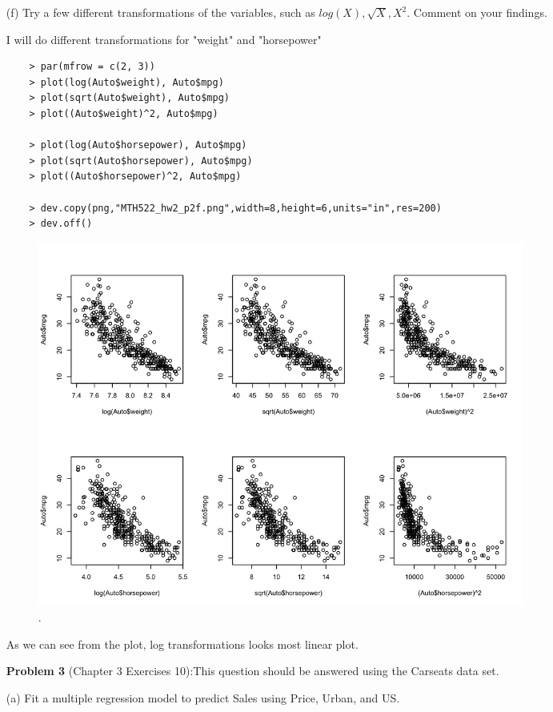 \documentclass{article}
\begin{document}
\begin{itemize}
\newpage


\item[(f)] Try a few different transformations of the variables, such as $ log(X), \sqrt{X}, X^2 $. Comment on your findings.


I will do different transformations for "weight" and "horsepower"

\begin{program}
	\begin{verbatim}
	> par(mfrow = c(2, 3))
	> plot(log(Auto$weight), Auto$mpg)
	> plot(sqrt(Auto$weight), Auto$mpg)
	> plot((Auto$weight)^2, Auto$mpg)

	> plot(log(Auto$horsepower), Auto$mpg)
	> plot(sqrt(Auto$horsepower), Auto$mpg)
	> plot((Auto$horsepower)^2, Auto$mpg)
	
	> dev.copy(png,"MTH522_hw2_p2f.png",width=8,height=6,units="in",res=200)
	> dev.off()

	\end{verbatim}
	\caption{The R code used to generate Figure.\ \ref{fig:MTH522_hw2_p2f}.}
\end{program}


\begin{figure}[htb]
	\begin{center}
		\includegraphics[width=0.8\textwidth]{MTH522_hw2_p2f.png}
	\end{center}
	\caption{.}
	\label{fig:MTH522_hw2_p2f}
\end{figure}

As we can see from the plot, log transformations looks most linear plot.


\newpage
{\bf Problem 3} (Chapter 3 Exercises 10):This question should be answered using the Carseats data set.
\item[(a)] Fit a multiple regression model to predict Sales using Price, Urban, and US.


\end{itemize}
\end{document}
